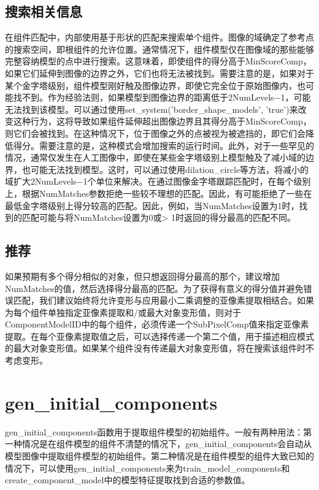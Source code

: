 \documentclass{article}
\begin{document}
\subsection{搜索相关信息}
在组件匹配中，内部使用基于形状的匹配来搜索单个组件。图像的域确定了参考点的搜索空间，即根组件的允许位置。通常情况下，组件模型仅在图像域的那些能够完整容纳模型的点中进行搜索。这意味着，即使组件的得分高于MinScoreComp，如果它们延伸到图像的边界之外，它们也将无法被找到。需要注意的是，如果对于某个金字塔级别，组件模型刚好触及图像边界，即使它完全位于原始图像内，也可能找不到。作为经验法则，如果模型到图像边界的距离低于2NumLevels−1，可能无法找到该模型。可以通过使用set_system('border_shape_models', 'true')来改变这种行为，这将导致如果组件延伸超出图像边界且其得分高于MinScoreComp，则它们会被找到。在这种情况下，位于图像之外的点被视为被遮挡的，即它们会降低得分。需要注意的是，这种模式会增加搜索的运行时间。此外，对于一些罕见的情况，通常仅发生在人工图像中，即使在某些金字塔级别上模型触及了减小域的边界，也可能无法找到模型。这时，可以通过使用dilation_circle等方法，将减小的域扩大2NumLevels−1个单位来解决。在通过图像金字塔跟踪匹配时，在每个级别上，根据NumMatches参数拒绝一些较不理想的匹配。因此，有可能拒绝了一些在最低金字塔级别上得分较高的匹配。因此，例如，当NumMatches设置为1时，找到的匹配可能与将NumMatches设置为0或> 1时返回的得分最高的匹配不同。

\subsection{推荐}
如果预期有多个得分相似的对象，但只想返回得分最高的那个，建议增加NumMatches的值，然后选择得分最高的匹配。为了获得有意义的得分值并避免错误匹配，我们建议始终将允许变形与应用最小二乘调整的亚像素提取相结合。如果为每个组件单独指定亚像素提取和/或最大对象变形值，则对于ComponentModelID中的每个组件，必须传递一个SubPixelComp值来指定亚像素提取。在每个亚像素提取值之后，可以选择传递一个第二个值，用于描述相应模式的最大对象变形值。如果某个组件没有传递最大对象变形值，将在搜索该组件时不考虑变形。

\section{gen\_initial\_components}
gen\_initial\_components函数用于提取组件模型的初始组件。一般有两种用法：第一种情况是在组件模型的组件不清楚的情况下，gen\_initial\_components会自动从模型图像中提取组件模型的初始组件。第二种情况是在组件模型的组件大致已知的情况下，可以使用gen\_initial\_components来为train\_model\_components和create\_component\_model中的模型特征提取找到合适的参数值。
\end{document}
